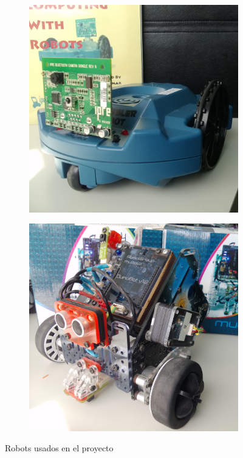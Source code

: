 \begin{figure}
    \centering
    \begin{subfigure}[b]{0.49\textwidth}
        \includegraphics[width=\textwidth]{figures/scribbler}
        \label{fig:robots_usados_scribbler}
    \end{subfigure}
    \begin{subfigure}[b]{0.49\textwidth}
        \includegraphics[width=\textwidth]{figures/n6}
        \label{fig:robots_usados_n6}
    \end{subfigure}
    \caption{Robots usados en el proyecto}
    \label{fig:robots_usados}
\end{figure}

